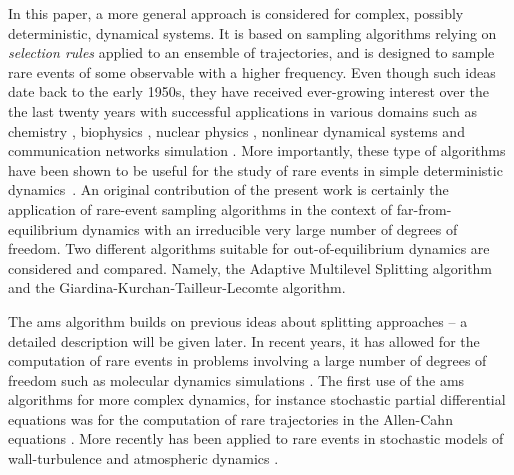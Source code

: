 \documentclass{jfm}
\newcommand{\EL}[1]{{\color{myred}{#1}}}
\begin{document}
% 
In this paper, a more general approach is considered for complex, possibly deterministic, dynamical systems.
It is based on sampling algorithms relying on \emph{selection rules} applied to an ensemble of trajectories, and is designed to sample rare events of some observable with a higher frequency.
% 
% 
Even though such ideas date back to the early 1950s, they have received ever-growing interest over the the last twenty years with successful applications in various domains such as chemistry \citep{van_erp_elaborating_2005,escobedo_transition_2009,teo_adaptive_2016}, biophysics \citep{huber_weighted-ensemble_1996,zuckerman2017weighted,bolhuis2005kinetic}, nuclear physics \citep{louvin2017}, nonlinear dynamical systems \citep{tailleur_probing_2007} and communication networks simulation \citep{villen-altamirano_restart:_1994}.
More importantly, these type of algorithms have been shown to be useful for the study of rare events in simple deterministic dynamics~\citep{wouters2016rare}.
% 
% 
An original contribution of the present work is certainly the application of rare-event sampling algorithms in the context of far-from-equilibrium dynamics with an irreducible very large number of degrees of freedom.
% 
Two different algorithms suitable for out-of-equilibrium dynamics are considered and compared. Namely, the Adaptive Multilevel Splitting algorithm and the Giardina-Kurchan-Tailleur-Lecomte algorithm.
% 

The \acl{ams} algorithm \citep{cerou_adaptive_2007} builds on previous ideas about splitting approaches \citep{KahnHarris1951,glasserman_look_1998,glasserman_multilevel_1999} -- a detailed description will be given later.
In recent years, it has allowed for the computation of rare events in problems involving a large number of degrees of freedom such as molecular dynamics simulations \citep{aristoff_adaptive_2015,teo_adaptive_2016}. The first use of the \ac{ams} algorithms for more complex dynamics, for instance stochastic partial differential equations was for the computation of rare trajectories in the Allen-Cahn equations \citep{rolland_computing_2016}. More recently \EL{it} has been applied to rare events in stochastic models of wall-turbulence \citep{rolland_extremely_2018} and atmospheric dynamics \citep{bouchet2019rare}.
\end{document}
